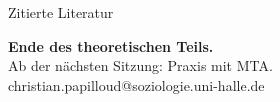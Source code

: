 \documentclass[aspectratio=169,11pt]{beamer}
\begin{document}
\begin{frame}[allowframebreaks]{Zitierte Literatur}
\end{frame}

\begin{frame}[plain]
  \begin{center}
    \vspace*{1.5em}
    {\Large\bfseries Ende des theoretischen Teils.}
    \\[2em]
    Ab der nächsten Sitzung: Praxis mit MTA.
    \\[3em]
    \footnotesize\color{black!60}
    christian.papilloud@soziologie.uni-halle.de
  \end{center}
\end{frame}
\end{document}
